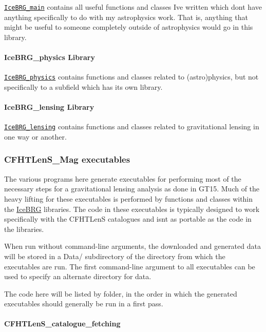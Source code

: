 \href{md_IceBRG_main.html}{\tt Ice\+B\+R\+G\+\_\+main} contains all useful functions and classes I\textquotesingle{}ve written which don\textquotesingle{}t have anything specifically to do with my astrophysics work. That is, anything that might be useful to someone completely outside of astrophysics would go in this library.

\paragraph*{Ice\+B\+R\+G\+\_\+physics Library}

\href{md_IceBRG_physics.html}{\tt Ice\+B\+R\+G\+\_\+physics} contains functions and classes related to (astro)physics, but not specifically to a subfield which has its own library.

\paragraph*{Ice\+B\+R\+G\+\_\+lensing Library}

\href{md_IceBRG_lensing.html}{\tt Ice\+B\+R\+G\+\_\+lensing} contains functions and classes related to gravitational lensing in one way or another.

\subsubsection*{C\+F\+H\+T\+Len\+S\+\_\+\+Mag executables}

The various programs here generate executables for performing most of the necessary steps for a gravitational lensing analysis as done in G\+T15. Much of the heavy lifting for these executables is performed by functions and classes within the \hyperlink{namespaceIceBRG}{Ice\+B\+R\+G} libraries. The code in these executables is typically designed to work specifically with the C\+F\+H\+T\+Len\+S catalogues and isn\textquotesingle{}t as portable as the code in the libraries.

When run without command-\/line arguments, the downloaded and generated data will be stored in a Data/ subdirectory of the directory from which the executables are run. The first command-\/line argument to all executables can be used to specify an alternate directory for data.

The code here will be listed by folder, in the order in which the generated executables should generally be run in a first pass.

\paragraph*{C\+F\+H\+T\+Len\+S\+\_\+catalogue\+\_\+fetching}

